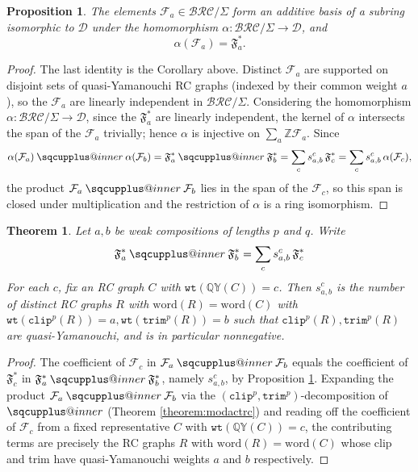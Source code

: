 \documentclass{amsart}
\makeatletter
\newcommand{\sqcupplus@inner}[2]{%
  \vcenter{\hbox{\ooalign{%
    \hfil$\m@th#1\sqcup$\hfil\cr
    \hfil\raisebox{0.15ex}{$\m@th#1\scriptscriptstyle+$}\hfil\cr
  }}}%
}
\newcommand{\sqcupplus}{\mathbin{\mathpalette\sqcupplus@inner\relax}}
\newtheorem{proposition}[lemma]{Proposition}
\newtheorem{theorem}{Theorem}[section]
\theoremstyle{definition}
\theoremstyle{remark}
\numberwithin{equation}{subsection}
\newcommand{\wtt}{\mathtt{wt}}
\newcommand{\QY}{\ensuremath{\mathbb{QY}}}
\newcommand{\trm}{\mathtt{trim}}
\newcommand{\clp}{\mathtt{clip}}
\newcommand{\BRC}{\mathcal{BRC}}
\newcommand{\dcoma}{\mathcal{D}}
\makeatother
\begin{document}
\begin{proposition}\label{proposition:slidebasis}
The elements $\mathcal{F}_a\in\BRC/\Sigma$ form an additive basis of a subring isomorphic to $\dcoma$ under the homomorphism $\alpha:\BRC/\Sigma\to\dcoma$, and
$$\alpha(\mathcal{F}_a)=\mathfrak{F}_a^*.$$
\end{proposition}
\begin{proof}
The last identity is the Corollary above. Distinct $\mathcal{F}_a$ are supported on disjoint sets of quasi-Yamanouchi RC graphs (indexed by their common weight $a$), so the $\mathcal{F}_a$ are linearly independent in $\BRC/\Sigma$. Considering the homomorphism $\alpha:\BRC/\Sigma\to\dcoma$, since the $\mathfrak{F}_a^*$ are linearly independent, the kernel of $\alpha$ intersects the span of the $\mathcal{F}_a$ trivially; hence $\alpha$ is injective on $\sum_a \mathbb{Z}\mathcal{F}_a$. Since
$$\alpha(\mathcal{F}_a)\sqcupplus\alpha(\mathcal{F}_b)=\mathfrak{F}_a^*\sqcupplus\mathfrak{F}_b^*=\sum_c s_{a,b}^c\,\mathfrak{F}_c^*=\sum_c s_{a,b}^c\,\alpha(\mathcal{F}_c),$$
the product $\mathcal{F}_a\sqcupplus\mathcal{F}_b$ lies in the span of the $\mathcal{F}_c$, so this span is closed under multiplication and the restriction of $\alpha$ is a ring isomorphism.
\end{proof}

\begin{theorem} \label{theorem:lrfslide}
  Let $a,b$ be weak compositions of lengths $p$ and $q$. Write
$$\mathfrak{F}_a^*\sqcupplus\mathfrak{F}_b^*=\sum_c s_{a,b}^c\,\mathfrak{F}_c^*$$
For each $c$, fix an RC graph $C$ with $\wtt(\QY(C)) = c$. Then $s_{a,b}^c$ is the number of distinct RC graphs $R$ with $\mathrm{word}(R)=\mathrm{word}(C)$ with $\wtt(\clp^p(R)) = a,\wtt(\trm^p(R)) = b$ such that $\clp^p(R),\trm^p(R)$ are quasi-Yamanouchi, and is in particular nonnegative.
\end{theorem}
\begin{proof}
The coefficient of $\mathcal{F}_c$ in $\mathcal{F}_a\sqcupplus\mathcal{F}_b$ equals the coefficient of $\mathfrak{F}_c^*$ in $\mathfrak{F}_a^*\sqcupplus\mathfrak{F}_b^*$, namely $s_{a,b}^c$, by Proposition \ref{proposition:slidebasis}. Expanding the product $\mathcal{F}_a\sqcupplus\mathcal{F}_b$ via the $(\clp^p,\trm^p)$-decomposition of $\sqcupplus$ (Theorem \ref{theorem:modactrc}) and reading off the coefficient of $\mathcal{F}_c$ from a fixed representative $C$ with $\wtt(\QY(C))=c$, the contributing terms are precisely the RC graphs $R$ with $\mathrm{word}(R)=\mathrm{word}(C)$ whose clip and trim have quasi-Yamanouchi weights $a$ and $b$ respectively.
\end{proof}
\end{document}
